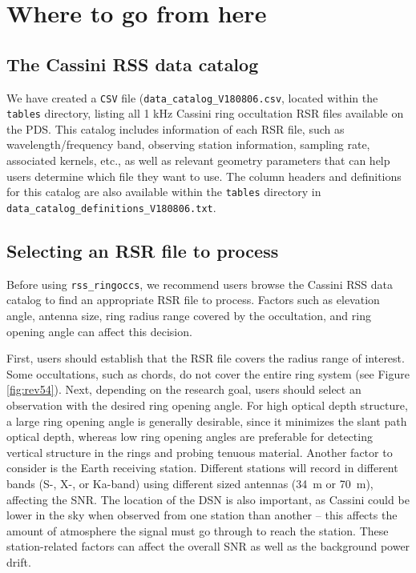 \documentclass[titlepage, 12pt]{article}
\begin{document}
    \section{Where to go from here}
        \subsection{The Cassini RSS data catalog}
            We have created a \texttt{CSV} file (\texttt{data\_catalog\_V180806.csv}, located within
            the \texttt{tables} directory, listing all 1 kHz Cassini
            ring occultation RSR files available on the PDS.
            This catalog includes information of each RSR
            file, such as wavelength/frequency band, observing
            station information, sampling rate, associated
            kernels, etc., as well as relevant geometry parameters
            that can help users determine which file they want
            to use. The column headers and definitions for this
            catalog are also available within the
            \texttt{tables} directory in \texttt{data\_catalog\_definitions\_V180806.txt}.
        \subsection{Selecting an RSR file to process}
            \label{choose_rsr}
            Before using \texttt{rss\_ringoccs}, we recommend users
            browse the Cassini RSS data catalog to find an appropriate
            RSR file to process. Factors such as elevation angle,
            antenna size, ring radius range covered by the occultation, and ring opening angle can
            affect this decision. 
            \par\hfill\par
            First, users should establish that the RSR file covers
            the radius range of interest. Some occultations, such
            as chords, do not cover the entire ring system
            (see Figure \ref{fig:rev54}). Next, depending on the
            research goal, users should select an observation with
            the desired ring opening angle. For high optical depth structure, a large 
            ring opening angle is generally desirable, since it minimizes the slant
            path optical depth, whereas low ring opening angles are preferable for detecting vertical structure in the rings and probing tenuous material. Another
            factor to consider is the Earth receiving station.
            Different stations will record in different bands
            (S-, X-, or Ka-band) using different sized antennas
            (34~m or 70~m), affecting the SNR. The location of the DSN is also important,
            as Cassini could be lower in the sky when observed from one station
            than another -- this affects the
            amount of atmosphere the signal must go through to reach
            the station. These station-related factors can affect
            the overall SNR as well as the background power drift.
\end{document}
